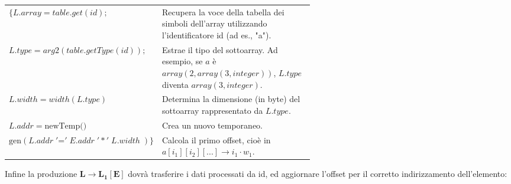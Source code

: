 \documentclass[11pt]{article}
\begin{document}
\begin{center}
\begin{tabularx}{\linewidth}{l m{0.6\linewidth}}
$\{L.array = table.get(id);$ 
    & \small Recupera la voce della tabella dei simboli dell'array utilizzando l'identificatore id (ad es., "a"). \\[0.3cm]

$L.type = arg2(table.getType(id));$ 
    & \small Estrae il tipo del sottoarray. Ad esempio, se $a$ è $array(2, array(3, integer))$, $L.type$ diventa $array(3, integer)$. \\[0.3cm]

$L.width = width(L.type)$ 
    & \small Determina la dimensione (in byte) del sottoarray rappresentato da $L.type$. \\[0.3cm]

$L.addr = \text{newTemp()}$ 
    & \small Crea un nuovo temporaneo. \\[0.3cm]

$\text{gen}(L.addr \;'\mathord{=}'\;E.addr \;'*'\; L.width\; )\}$ 
    & \small Calcola il primo offset, cioè in $a[i_1][i_2][...] \rightarrow i_1 \cdot w_1$. \\
\end{tabularx}
\end{center}



  



\noindent Infine la produzione $\mathbf{L \rightarrow L_1[E] }$ dovrà trasferire i dati processati da id,
ed aggiornare l'offset per il corretto indirizzamento dell'elemento:
\end{document}
